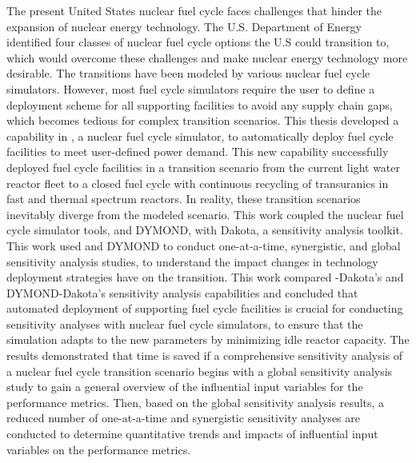 \vspace{-1cm}
The present United States nuclear fuel cycle faces challenges that hinder 
the expansion of nuclear energy technology. 
The U.S. Department of Energy identified four classes of nuclear fuel cycle 
options the U.S could transition to, which would overcome these challenges 
and make nuclear energy technology more desirable. 
The transitions have been modeled by various nuclear fuel cycle simulators. 
However, most fuel cycle simulators require the user to define a deployment 
scheme for all supporting facilities to avoid any supply chain gaps, which becomes 
tedious for complex transition scenarios.
This thesis developed a capability in \Cyclus, a nuclear fuel cycle simulator, 
to automatically deploy fuel cycle 
facilities to meet user-defined power demand. 
This new capability successfully deployed fuel cycle facilities
in a transition scenario from the current 
light water reactor fleet to a closed fuel cycle with continuous recycling of transuranics in fast and 
thermal spectrum reactors.
In reality, these transition scenarios inevitably diverge from the 
modeled scenario. 
This work coupled the nuclear fuel cycle simulator tools, \Cyclus and DYMOND, 
with Dakota, a sensitivity analysis toolkit. 
This work used \Cyclus and DYMOND to conduct one-at-a-time, synergistic, 
and global sensitivity analysis studies, to understand the impact changes 
in technology deployment strategies have on the transition.
This work compared \Cyclus-Dakota's and DYMOND-Dakota's sensitivity 
analysis capabilities 
and concluded that automated deployment of supporting fuel cycle 
facilities is crucial for conducting sensitivity analyses 
with nuclear fuel cycle simulators, to ensure that the simulation 
adapts to the new parameters by minimizing idle reactor capacity. 
The results demonstrated that time is saved if a comprehensive 
sensitivity analysis of a nuclear fuel cycle transition scenario 
begins with a global sensitivity analysis study to gain a general 
overview of the influential input variables for the performance metrics. 
Then, based on the global sensitivity analysis results, a reduced number of 
one-at-a-time and synergistic sensitivity analyses are conducted 
to determine quantitative trends and impacts of influential 
input variables on the performance metrics.